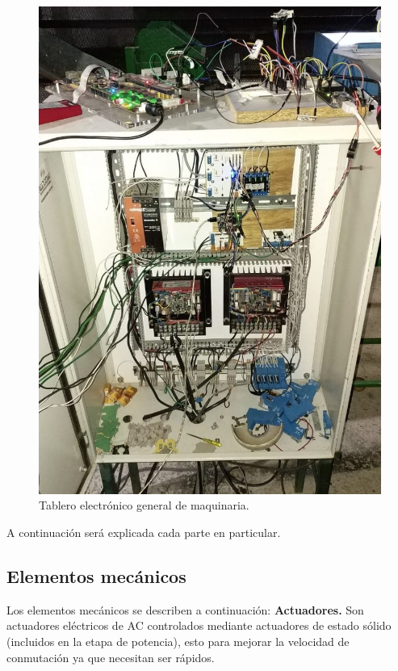 \documentclass[twoside,spanish,ESP,MSc]{plantillaLabUPV}
\theoremstyle{definition}
\begin{document}
\begin{figure}[!tbh]
	\centering
	\includegraphics[height=0.5\textheight]{ima/tablero}
	\caption{Tablero electrónico general de maquinaria.}
	\label{fig:tablero}
\end{figure}

A continuación será explicada cada parte en particular.


\subsection{Elementos mecánicos}
Los elementos mecánicos se describen a continuación:
\checkmark\textbf{Actuadores.} Son actuadores eléctricos de AC controlados mediante actuadores de estado sólido (incluidos en la etapa de potencia), esto para mejorar la velocidad de conmutación ya que necesitan ser rápidos.
\end{document}
